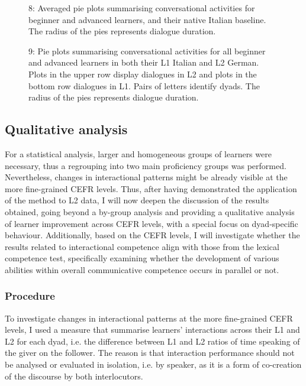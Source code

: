   
 

\begin{stylecaption}\begin{figure}
\caption{8: Averaged pie plots summarising conversational activities for beginner and advanced learners, and their native Italian baseline. The radius of the pies represents dialogue duration.}
\label{fig:key:3}
\end{figure}\end{stylecaption}

  
 

\begin{stylecaption}\begin{figure}
\caption{9: Pie plots summarising conversational activities for all beginner and advanced learners in both their L1 Italian and L2 German. Plots in the upper row display dialogues in L2 and plots in the bottom row dialogues in L1. Pairs of letters identify dyads. The radius of the pies represents dialogue duration.}
\label{fig:key:3}
\end{figure}\end{stylecaption}

\subsection{Qualitative analysis}
\hypertarget{Toc191305936}{}
For a statistical analysis, larger and homogeneous groups of learners were necessary, thus a regrouping into two main proficiency groups was performed. Nevertheless, changes in interactional patterns might be already visible at the more fine-grained CEFR levels. Thus, after having demonstrated the application of the method to L2 data, I will now deepen the discussion of the results obtained, going beyond a by-group analysis and providing a qualitative analysis of learner improvement across CEFR levels, with a special focus on dyad-specific behaviour. Additionally, based on the CEFR levels, I will investigate whether the results related to interactional competence align with those from the lexical competence test, specifically examining whether the development of various abilities within overall communicative competence occurs in parallel or not.

\subsubsection{Procedure}
\hypertarget{Toc191305937}{}
To investigate changes in interactional patterns at the more fine-grained CEFR levels, I used a measure that summarise learners’ interactions across their L1 and L2 for each dyad, i.e. the difference between L1 and L2 ratios of time speaking of the giver on the follower. The reason is that interaction performance should not be analysed or evaluated in isolation, i.e. by speaker, as it is a form of co-creation of the discourse by both interlocutors. 

